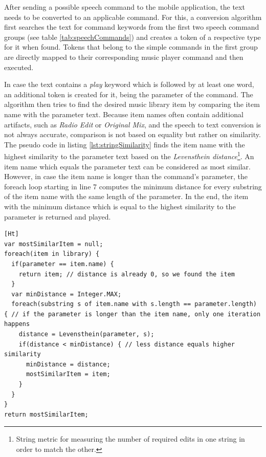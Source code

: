 After sending a possible speech command to the mobile application, the text needs to be converted to an applicable command. For this, a conversion algorithm first searches the text for command keywords from the first two speech command groups (see table \ref{tab:speechCommands}) and creates a token of a respective type for it when found. Tokens that belong to the simple commands in the first group are directly mapped to their corresponding music player command and then executed. 

In case the text contains a \textit{play} keyword which is followed by at least one word, an additional token is created for it, being the parameter of the command. The algorithm then tries to find the desired music library item by comparing the item name with the parameter text. Because item names often contain additional artifacts, such as \textit{Radio Edit} or \textit{Original Mix}, and the speech to text conversion is not always accurate, comparison is not based on equality but rather on similarity. The pseudo code in listing \ref{lst:stringSimilarity} finds the item name with the highest similarity to the parameter text based on the \textit{Levensthein distance}\footnote{String metric for measuring the number of required edits in one string in order to match the other.}. An item name which equals the parameter text can be considered as most similar. However, in case the item name is longer than the command's parameter, the foreach loop starting in line 7 computes the minimum distance for every substring of the item name with the same length of the parameter. In the end, the item with the minimum distance which is equal to the highest similarity to the parameter is returned and played.

\begin{lstlisting}[caption=Calculating parameter and music item name similarity, label=lst:stringSimilarity][Ht]
var mostSimilarItem = null;
foreach(item in library) {
  if(parameter == item.name) { 
    return item; // distance is already 0, so we found the item
  }
  var minDistance = Integer.MAX;
  foreach(substring s of item.name with s.length == parameter.length) { // if the parameter is longer than the item name, only one iteration happens
    distance = Levensthein(parameter, s);
    if(distance < minDistance) { // less distance equals higher similarity
      minDistance = distance;
      mostSimilarItem = item;
    }
  }
}
return mostSimilarItem;
\end{lstlisting}

